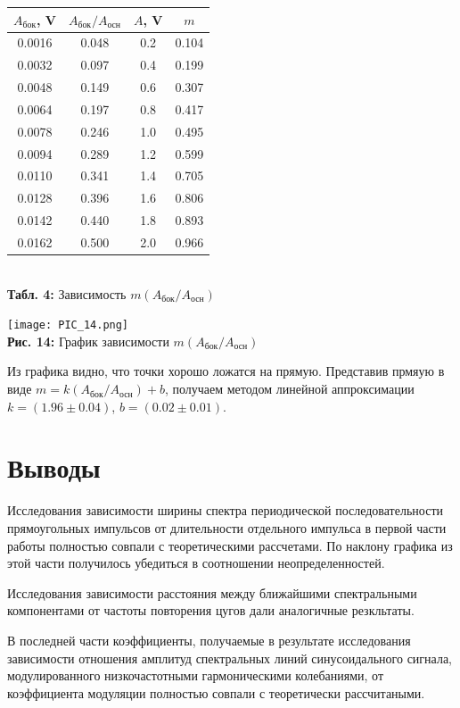 \documentclass[12pt,a4paper]{scrartcl}
\begin{document}
	\begin{center}
		\begin{tabular}{|c|c|c|c|}
			\hline
			$A_{\text{бок}}$, V & $A_{\text{бок}} / A_{\text{осн}}$ & $A$, V & $m$
			\\\hline
			0.0016 & 0.048 & 0.2 & 0.104
			\\\hline
			0.0032 & 0.097 & 0.4 & 0.199
			\\\hline
			0.0048 & 0.149 & 0.6 & 0.307
			\\\hline
			0.0064 & 0.197 & 0.8 & 0.417
			\\\hline
			0.0078 & 0.246 & 1.0 & 0.495
			\\\hline
			0.0094 & 0.289 & 1.2 & 0.599
			\\\hline
			0.0110 & 0.341 & 1.4 & 0.705
			\\\hline
			0.0128 & 0.396 & 1.6 & 0.806
			\\\hline
			0.0142 & 0.440 & 1.8 & 0.893
			\\\hline
			0.0162 & 0.500 & 2.0 & 0.966
			\\\hline
		\end{tabular}
		\\\textbf{Табл. 4:} Зависимость $m(A_{\text{бок}} / A_{\text{осн}})$
	\end{center}

	\begin{center}
		\texttt{[image: PIC\_14.png]}
		\\\textbf{Рис. 14:} График зависимости $m(A_{\text{бок}} / A_{\text{осн}})$
	\end{center}
	
	 Из графика видно, что точки хорошо ложатся на прямую. Представив прмяую в виде $m = k(A_{\text{бок}} / A_{\text{осн}}) + b$, получаем методом линейной аппроксимации $k = (1.96 \pm 0.04)$, $b = (0.02 \pm 0.01)$.
	
	\section{Выводы}
	
	Исследования зависимости ширины спектра периодической последовательности прямоугольных импульсов от длительности отдельного импульса в первой части работы полностью совпали с теоретическими рассчетами. По наклону графика из этой части получилось убедиться в соотношении неопределенностей.
	
	Исследования зависимости расстояния между ближайшими спектральными компонентами от частоты повторения цугов дали аналогичные резкльтаты.
	
	В последней части коэффициенты, получаемые в результате исследования зависимости отношения амплитуд спектральных линий синусоидального сигнала, модулированного низкочастотными гармоническими колебаниями, от коэффициента модуляции полностью совпали с теоретически рассчитаными.
	
\end{document}

